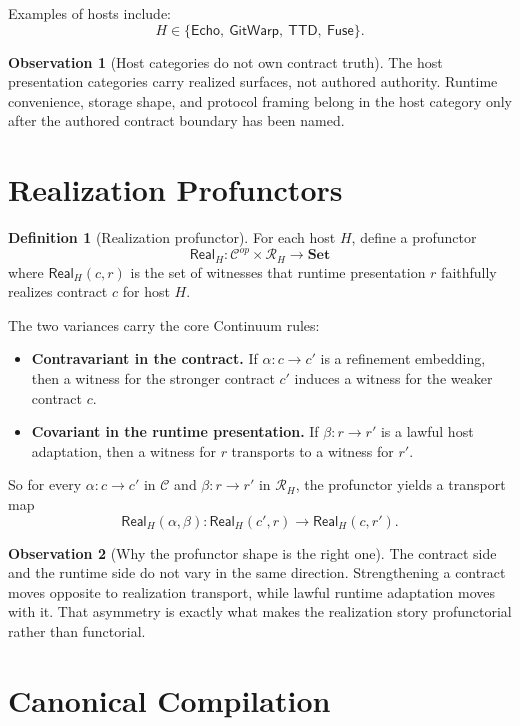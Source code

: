 \documentclass[11pt]{article}
\newcommand{\Ctr}{\mathcal{C}}
\newcommand{\RHost}[1]{\mathcal{R}_{#1}}
\newcommand{\Set}{\mathbf{Set}}
\newcommand{\Real}{\mathsf{Real}}
\newcommand{\TTD}{\ensuremath{\mathsf{TTD}}}
\newcommand{\Echo}{\ensuremath{\mathsf{Echo}}}
\newcommand{\GitWarp}{\ensuremath{\mathsf{GitWarp}}}
\newcommand{\Fuse}{\ensuremath{\mathsf{Fuse}}}
\theoremstyle{definition}
\newtheorem{definition}{Definition}
\newtheorem{observation}{Observation}
\begin{document}
Examples of hosts include:
\[
H \in \{\Echo,\ \GitWarp,\ \TTD,\ \Fuse\}.
\]

\begin{observation}[Host categories do not own contract truth]
The host presentation categories carry realized surfaces, not authored
authority. Runtime convenience, storage shape, and protocol framing belong in
the host category only after the authored contract boundary has been named.
\end{observation}

\section{Realization Profunctors}

\begin{definition}[Realization profunctor]
For each host $H$, define a profunctor
\[
\Real_H : \Ctr^{op} \times \RHost{H} \to \Set
\]
where $\Real_H(c,r)$ is the set of witnesses that runtime presentation $r$
faithfully realizes contract $c$ for host $H$.
\end{definition}

The two variances carry the core Continuum rules:
\begin{itemize}[leftmargin=2em]
\item \textbf{Contravariant in the contract.} If
  $\alpha : c \to c'$ is a refinement embedding, then a witness for the
  stronger contract $c'$ induces a witness for the weaker contract $c$.
\item \textbf{Covariant in the runtime presentation.} If
  $\beta : r \to r'$ is a lawful host adaptation, then a witness for $r$
  transports to a witness for $r'$.
\end{itemize}

So for every $\alpha : c \to c'$ in $\Ctr$ and $\beta : r \to r'$ in
$\RHost{H}$, the profunctor yields a transport map
\[
\Real_H(\alpha,\beta) : \Real_H(c',r) \to \Real_H(c,r').
\]

\begin{observation}[Why the profunctor shape is the right one]
The contract side and the runtime side do not vary in the same direction.
Strengthening a contract moves opposite to realization transport, while lawful
runtime adaptation moves with it. That asymmetry is exactly what makes the
realization story profunctorial rather than functorial.
\end{observation}

\section{Canonical Compilation}
\end{document}
